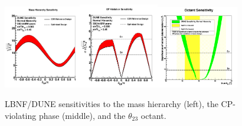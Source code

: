 \begin{figure}
\caption{LBNF/DUNE sensitivities to the mass hierarchy (left), the CP-violating phase (middle), and the $\theta_{23}$ octant.}
\label{fig:sensitivity}
\centering
\includegraphics[width=0.30\textwidth, keepaspectratio=true]{figs/sensitivity_MH.png}\includegraphics[width=0.31\textwidth, keepaspectratio=true]{figs/sensitivity_CP.png}\includegraphics[width=0.32\textwidth, keepaspectratio=true]{figs/sensitivity_theta23.png}
\end{figure}
